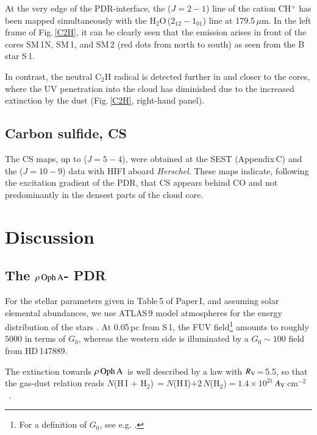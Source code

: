 \documentclass{aa}
\newcommand{\cmtwo}{cm$^{-2}$}
\newcommand{\um}{$\mu$m}                                 %
\newcommand{\molh}{H$_{2}$}                              %
\newcommand{\water}{H$_{2}$O}
\newcommand{\av}{$A_{\rm V}$}                     %
\newcommand{\rv}{$R_{\rm V}$}
\newcommand{\roa}{$\rho \, {\rm Oph \, A}$}
\begin{document}
At the very edge of the PDR-interface, the ($J=2-1$) line of the cation CH$^+$ has been mapped simultaneously with the \water\,($2_{12}-1_{01}$) line at 179.5\,\um. In the left frame of Fig.\,\ref{C2H}, it can be clearly seen that the emission arises in front of the cores SM\,1N, SM\,1, and SM\,2 (red dots from north to south) as seen from the B star S\,1. 

In contrast, the neutral C$_2$H radical is detected further in and closer to the cores, where the UV penetration into the cloud has diminished due to the increased extinction by the dust (Fig.\,\ref{C2H}, right-hand panel).

\subsection{Carbon sulfide, CS}

The CS maps, up to ($J=5-4$), were obtained at the SEST (Appendix\,C) and the ($J=10-9$) data with HIFI aboard {\it Herschel}. These maps indicate, following the excitation gradient of the PDR, that CS appears behind CO and not predominantly in the densest parts of the cloud core.



\section{Discussion}


\subsection{The \roa- PDR}

For the stellar parameters given in Table\,5 of Paper\,I, and assuming solar elemental abundances, we use ATLAS\,9 model atmospheres for the energy distribution of the stars \citep{castelli2004}.  At 0.05\,pc from S\,1, the FUV field\footnote{For a definition of $G_0$, see e.g. \citet{hollenbach1999}.} amounts to roughly $5000$ in terms of $G_0$, whereas the western side is illuminated by a $G_0 \sim 100$ field from HD\,147889. 

The extinction towards \roa\ is well described by a law with \rv\,=\,5.5, so that the gas-dust relation reads $N$(H\,I + \molh)$\,=N$(H\,I)$+ 2\,N$(\molh)$ =1.4 \times 10^{21}$\,\av\,\cmtwo\  \citep[][see also Paper\,I]{bohlin1978}. 
\end{document}
